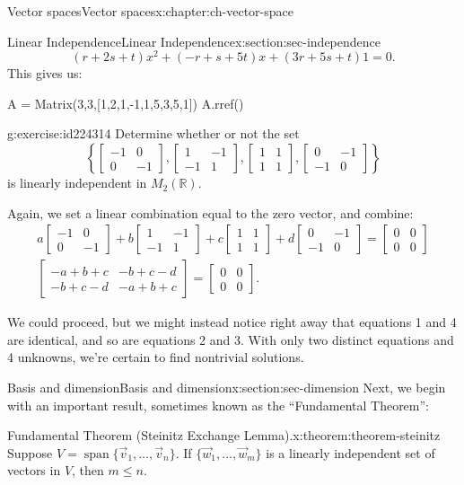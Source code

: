 \documentclass[oneside,10pt,]{book}
\numberwithin{equation}{section}
\newcommand{\spn}{\operatorname{span}}
\newcommand{\bbm}{\begin{bmatrix}}
\newcommand{\ebm}{\end{bmatrix}}
\newcommand{\amp}{&}
\begin{document}
\begin{chapterptx}{Vector spaces}{}{Vector spaces}{}{}{x:chapter:ch-vector-space}
\begin{sectionptx}{Linear Independence}{}{Linear Independence}{}{}{x:section:sec-independence}
\begin{equation*}
(r+2s+t)x^2+(-r+s+5t)x+(3r+5s+t)1=0.
\end{equation*}
This gives us:%
\begin{sageinput}
A = Matrix(3,3,[1,2,1,-1,1,5,3,5,1])
A.rref()
\end{sageinput}
\begin{inlineexercise}{}{g:exercise:id224314}%
Determine whether or not the set%
\begin{equation*}
\left\{\bbm -1\amp 0\\0\amp -1\ebm, \bbm 1\amp -1\\ -1\amp 1\ebm,
\bbm 1\amp 1\\1\amp 1\ebm, \bbm 0\amp -1\\-1\amp 0\ebm\right\}
\end{equation*}
is linearly independent in \(M_2(\mathbb{R})\).%
\end{inlineexercise}
Again, we set a linear combination equal to the zero vector, and combine:%
\begin{align*}
a\bbm -1\amp 0\\0\amp -1\ebm +b\bbm 1\amp -1\\ -1\amp 1\ebm
+c\bbm 1\amp 1\\1\amp 1\ebm +d \bbm 0\amp -1\\-1\amp 0\ebm = \bbm 0\amp 0\\ 0\amp 0\ebm\\
\bbm -a+b+c\amp -b+c-d\\-b+c-d\amp -a+b+c\ebm = \bbm 0\amp 0\\0\amp 0\ebm\text{.}
\end{align*}
%
\par
We could proceed, but we might instead notice right away that equations 1 and 4 are identical, and so are equations 2 and 3. With only two distinct equations and 4 unknowns, we're certain to find nontrivial solutions.%
\end{sectionptx}
%
%
\typeout{************************************************}
\typeout{************************************************}
%
\begin{sectionptx}{Basis and dimension}{}{Basis and dimension}{}{}{x:section:sec-dimension}
Next, we begin with an important result, sometimes known as the ``Fundamental Theorem'':%
\begin{theorem}{Fundamental Theorem (Steinitz Exchange Lemma).}{}{x:theorem:theorem-steinitz}%
Suppose \(V = \spn\{\vec{v}_1,\ldots, \vec{v}_n\}\). If \(\{\vec{w}_1,\ldots, \vec{w}_m\}\) is a linearly independent set of vectors in \(V\), then \(m\leq n\).%

\end{theorem}
\end{sectionptx}
\end{chapterptx}
\end{document}
